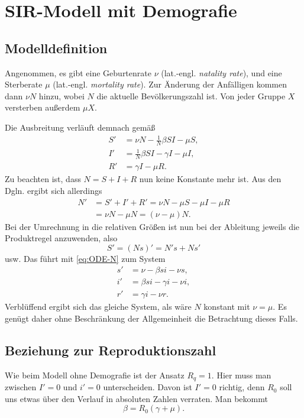 \documentclass[a4paper,10pt,fleqn,twocolumn,twoside,dvipdfmx]{scrartcl}
\numberwithin{equation}{section}
\begin{document}
\section{SIR-Modell mit Demografie}
\subsection{Modelldefinition}
Angenommen, es gibt eine Geburtenrate $\nu$ (lat.-engl. \emph{natality rate}), 
und eine Sterberate $\mu$ (lat.-engl. \emph{mortality rate}). Zur Änderung der
Anfälligen kommen dann $\nu N$ hinzu, wobei $N$ die aktuelle
Bevölkerungszahl ist. Von jeder Gruppe $X$ versterben außerdem $\mu X$.

Die Ausbreitung verläuft demnach gemäß%
\begin{align}
S' &= \nu N - \tfrac{1}{N}\beta SI - \mu S,\\
I' &= \tfrac{1}{N}\beta SI - \gamma I - \mu I,\\
R' &= \gamma I - \mu R.
\end{align}
Zu beachten ist, dass $N=S+I+R$ nun keine Konstante mehr
ist. Aus den Dgln. ergibt sich allerdings
\begin{equation}\label{eq:ODE-N}
\begin{split}
N' &= S'+I'+R' = \nu N - \mu S - \mu I - \mu R\\
&= \nu N - \mu N = (\nu-\mu)N.
\end{split}
\end{equation}
Bei der Umrechnung in die relativen Größen ist nun bei der
Ableitung jeweils die Produktregel anzuwenden, also
\[S' = (Ns)' = N's + Ns'\]
usw. Das führt mit \eqref{eq:ODE-N} zum System
\begin{align}
s' &= \nu - \beta si - \nu s,\\
i' &= \beta si - \gamma i - \nu i,\\
r' &= \gamma i - \nu r.
\end{align}
Verblüffend ergibt sich das gleiche System, als wäre
$N$ konstant mit $\nu = \mu$. Es genügt daher ohne Beschränkung
der Allgemeinheit die Betrachtung dieses Falls.

\subsection{Beziehung zur Reproduktionszahl}

Wie beim Modell ohne Demografie ist der Ansatz $R_q = 1$.
Hier muss man zwischen $I'=0$ und $i'=0$ unterscheiden. Davon ist
$I'=0$ richtig, denn $R_0$ soll uns etwas über den Verlauf in
absoluten Zahlen verraten. Man bekommt
\begin{equation}
\beta = R_0(\gamma+\mu).
\end{equation}
\end{document}
